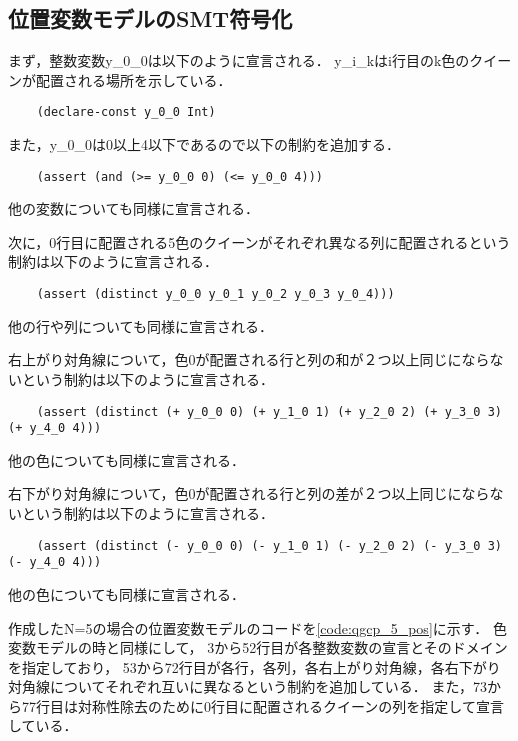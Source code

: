 


\subsection{位置変数モデルのSMT符号化}
まず，整数変数y\_0\_0は以下のように宣言される．
y\_i\_kはi行目のk色のクイーンが配置される場所を示している．
{ \scriptsize \begin{verbatim}
    (declare-const y_0_0 Int)
\end{verbatim}}
また，y\_0\_0は0以上4以下であるので以下の制約を追加する．
{ \scriptsize \begin{verbatim}
    (assert (and (>= y_0_0 0) (<= y_0_0 4)))
\end{verbatim}}
他の変数についても同様に宣言される．

次に，0行目に配置される5色のクイーンがそれぞれ異なる列に配置されるという制約は以下のように宣言される．
{ \scriptsize \begin{verbatim}
    (assert (distinct y_0_0 y_0_1 y_0_2 y_0_3 y_0_4)))
\end{verbatim}}
他の行や列についても同様に宣言される．

右上がり対角線について，色0が配置される行と列の和が２つ以上同じにならないという制約は以下のように宣言される．
{ \scriptsize \begin{verbatim}
    (assert (distinct (+ y_0_0 0) (+ y_1_0 1) (+ y_2_0 2) (+ y_3_0 3) (+ y_4_0 4)))
\end{verbatim}}
他の色についても同様に宣言される．

右下がり対角線について，色0が配置される行と列の差が２つ以上同じにならないという制約は以下のように宣言される．
{ \scriptsize \begin{verbatim}
    (assert (distinct (- y_0_0 0) (- y_1_0 1) (- y_2_0 2) (- y_3_0 3) (- y_4_0 4)))
\end{verbatim}}
他の色についても同様に宣言される．


作成したN=5の場合の位置変数モデルのコードを\ref{code:qgcp_5_pos}に示す．
色変数モデルの時と同様にして，
3から52行目が各整数変数の宣言とそのドメインを指定しており，
53から72行目が各行，各列，各右上がり対角線，各右下がり対角線についてそれぞれ互いに異なるという制約を追加している．
また，73から77行目は対称性除去のために0行目に配置されるクイーンの列を指定して宣言している．

